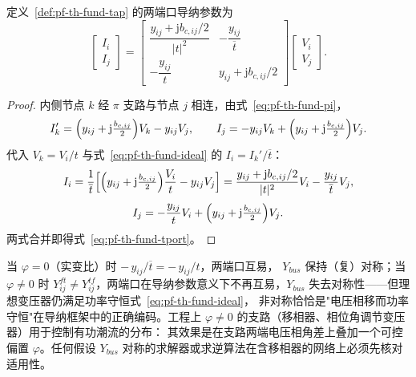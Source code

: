 \begin{proposition}[含变比与移相的一般支路模型]\label{prop:pf-th-fund-tport}
定义~\ref{def:pf-th-fund-tap} 的两端口导纳参数为
\begin{equation}
\begin{bmatrix}I_i\\ I_j\end{bmatrix}
=
\begin{bmatrix}
\dfrac{y_{ij}+\mathrm jb_{c,ij}/2}{|t|^2} & -\dfrac{y_{ij}}{\overline{t}}\\[2.2ex]
-\dfrac{y_{ij}}{t} & y_{ij}+\mathrm jb_{c,ij}/2
\end{bmatrix}
\begin{bmatrix}V_i\\ V_j\end{bmatrix}.
\label{eq:pf-th-fund-tport}
\end{equation}
\end{proposition}

\begin{proof}
内侧节点 $k$ 经 $\pi$ 支路与节点 $j$ 相连，由式~\eqref{eq:pf-th-fund-pi}，
\begin{equation}
I_k'=\Bigl(y_{ij}+\mathrm j\tfrac{b_{c,ij}}{2}\Bigr)V_k-y_{ij}V_j,\qquad
I_j=-y_{ij}V_k+\Bigl(y_{ij}+\mathrm j\tfrac{b_{c,ij}}{2}\Bigr)V_j .
\end{equation}
代入 $V_k=V_i/t$ 与式~\eqref{eq:pf-th-fund-ideal} 的 $I_i=I_k'/\overline{t}$：
\begin{equation}
I_i=\frac{1}{\overline{t}}\Bigl[\Bigl(y_{ij}+\mathrm j\tfrac{b_{c,ij}}{2}\Bigr)
\frac{V_i}{t}-y_{ij}V_j\Bigr]
=\frac{y_{ij}+\mathrm jb_{c,ij}/2}{|t|^2}V_i-\frac{y_{ij}}{\overline{t}}V_j ,
\end{equation}
\begin{equation}
I_j=-\frac{y_{ij}}{t}V_i+\Bigl(y_{ij}+\mathrm j\tfrac{b_{c,ij}}{2}\Bigr)V_j .
\end{equation}
两式合并即得式~\eqref{eq:pf-th-fund-tport}。
\end{proof}

\begin{remark}\label{rem:pf-th-fund-reciprocity}
当 $\varphi=0$（实变比）时 $-\,y_{ij}/\overline{t}=-\,y_{ij}/t$，两端口互易，
$Y_{bus}$ 保持（复）对称；当 $\varphi\neq0$ 时
$Y_{ij}^{ft}\neq Y_{ij}^{tf}$，两端口在导纳参数意义下不再互易，$Y_{bus}$
失去对称性——但理想变压器仍满足功率守恒式~\eqref{eq:pf-th-fund-ideal}，
非对称恰恰是"电压相移而功率守恒"在导纳框架中的正确编码。工程上
$\varphi\neq0$ 的支路（移相器、相位角调节变压器）用于控制有功潮流的分布：
其效果是在支路两端电压相角差上叠加一个可控偏置 $\varphi$。任何假设
$Y_{bus}$ 对称的求解器或求逆算法在含移相器的网络上必须先核对适用性。
\end{remark}

